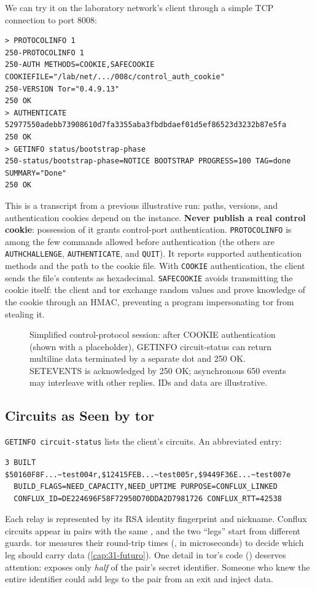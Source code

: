 We can try it on the laboratory network's client through a simple TCP connection to port 8008:
\begin{lstlisting}[numbers=none]
> PROTOCOLINFO 1
250-PROTOCOLINFO 1
250-AUTH METHODS=COOKIE,SAFECOOKIE COOKIEFILE="/lab/net/.../008c/control_auth_cookie"
250-VERSION Tor="0.4.9.13"
250 OK
> AUTHENTICATE 52977550adebb73908610d7fa3355aba3fbdbdaef01d5ef86523d3232b87e5fa
250 OK
> GETINFO status/bootstrap-phase
250-status/bootstrap-phase=NOTICE BOOTSTRAP PROGRESS=100 TAG=done SUMMARY="Done"
250 OK
\end{lstlisting}
This is a transcript from a previous illustrative run: paths, versions, and authentication cookies depend on the instance. \textbf{Never publish a real control cookie}: possession of it grants control-port authentication.
\texttt{PROTOCOLINFO} is among the few commands allowed before authentication (the others are \texttt{AUTHCHALLENGE}, \texttt{AUTHENTICATE}, and \texttt{QUIT}). It reports supported authentication methods and the path to the cookie file. With \texttt{COOKIE} authentication, the client sends the file's contents as hexadecimal. \texttt{SAFECOOKIE} avoids transmitting the cookie itself: the client and tor exchange random values and prove knowledge of the cookie through an HMAC, preventing a program impersonating tor from stealing it.

\begin{figure}[htbp]
\centering

\caption{Simplified control-protocol session: after COOKIE authentication (shown with a placeholder), GETINFO circuit-status can return multiline data terminated by a separate dot and 250 OK. SETEVENTS is acknowledged by 250 OK; asynchronous 650 events may interleave with other replies. IDs and data are illustrative.}
\label{fig:controllo}
\end{figure}

\subsection{Circuits as Seen by tor}

\texttt{GETINFO circuit-status} lists the client's circuits. An abbreviated entry:
\begin{lstlisting}[numbers=none]
3 BUILT $50160F8F...~test004r,$12415FEB...~test005r,$9449F36E...~test007e
  BUILD_FLAGS=NEED_CAPACITY,NEED_UPTIME PURPOSE=CONFLUX_LINKED
  CONFLUX_ID=DE224696F58F72950D70DDA2D7981726 CONFLUX_RTT=42538
\end{lstlisting}
Each relay is represented by its RSA identity fingerprint and nickname. Conflux circuits appear in pairs with the same , and the two \enquote{legs} start from different guards. tor measures their round-trip times (, in microseconds) to decide which leg should carry data (\cref{cap:31-futuro}). One detail in tor's code () deserves attention:  exposes only \emph{half} of the pair's secret identifier. Someone who knew the entire identifier could add legs to the pair from an exit and inject data.

